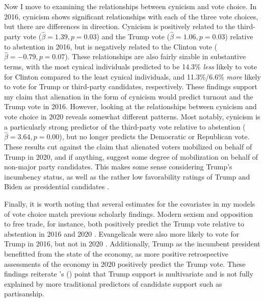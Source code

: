 \documentclass[12pt]{article}
\begin{document}
Now I move to examining the relationships between cynicism and vote choice. In 2016, cynicism shows significant relationships with each of the three vote choices, but there are differences in direction. Cynicism is positively related to the third-party vote ($\hat{\beta} = 1.39, p = 0.03$) and the Trump vote ($\hat{\beta} = 1.06, p = 0.03$) relative to abstention in 2016, but is negatively related to the Clinton vote ($\hat{\beta} = -0.79, p = 0.07$). These relationships are also fairly sizable in substantive terms, with the most cynical individuals predicted to be 14.3\% \textit{less} likely to vote for Clinton compared to the least cynical individuals, and 11.3\%/6.6\% \textit{more} likely to vote for Trump or third-party candidates, respectively. These findings support my claim that alienation in the form of cynicism would predict turnout and the Trump vote in 2016. However, looking at the relationships between cynicism and vote choice in 2020 reveals somewhat different patterns. Most notably, cynicism is a particularly strong predictor of the third-party vote relative to abstention ($\hat{\beta} = 3.64, p = 0.00$), but no longer predicts the Democratic or Republican vote. These results cut against the claim that alienated voters mobilized on behalf of Trump in 2020, and if anything, suggest some degree of mobilization on behalf of non-major party candidates. This makes some sense considering Trump's incumbency status, as well as the rather low favorability ratings of Trump and Biden as presidential candidates \parencite{saad2020favorable}. 

Finally, it is worth noting that several estimates for the covariates in my models of vote choice match previous scholarly findings. Modern sexism and opposition to free trade, for instance, both positively predict the Trump vote relative to abstention in 2016 and 2020 \parencite[e.g.,][]{mutz2018status,valentino2018mobilizing}. Evangelicals were also more likely to vote for Trump in 2016, but not in 2020 \parencite{margolis2020who}. Additionally, Trump as the incumbent president benefitted from the state of the economy, as more positive retrospective assessments of the economy in 2020 positively predict the Trump vote. These findings reiterate \citeauthor{enders2021modeling}'s (\citeyear{enders2021modeling}) point that Trump support is multivariate and is not fully explained by more traditional predictors of candidate support such as partisanship. 
\end{document}
